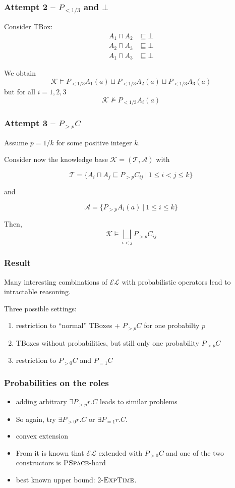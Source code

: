 \documentclass{beamer}
\newcommand{\el}{\ensuremath{\mathcal{EL}}\xspace}
\newcommand{\exptime}{\ensuremath{\textsc{ExpTime}}\xspace}
\newcommand{\pspace}{\ensuremath{\textsc{PSpace}}\xspace}
\begin{document}
\begin{frame}
  \frametitle{Attempt 2 -- $P_{<1/3}$ and $\bot$}

  Consider TBox: 
  \begin{align*}
    A_1\sqcap A_2 &\sqsubseteq\bot \\
    A_2\sqcap A_3 &\sqsubseteq\bot \\
    A_1\sqcap A_3 &\sqsubseteq\bot
  \end{align*}

  \pause
  We obtain 
  $$\mathcal K\models P_{<1/3}A_1(a)\sqcup P_{<1/3}A_2(a)\sqcup P_{<1/3}A_3(a)$$ but for all $i=1,2,3$ 
  $$\mathcal K\not\models P_{<1/3}A_i(a)$$
\end{frame}

\begin{frame}
  \frametitle{Attempt 3 -- $P_{>p}C$}
  Assume $p=1/k$ for some positive integer $k$.

  Consider now the knowledge base $\mathcal K=(\mathcal T, \mathcal A)$ with

  $$\mathcal T=\{A_i\sqcap A_j\sqsubseteq P_{>p}C_{ij}~|~1\leq i<j\leq k\}$$

  and 

  $$\mathcal A=\{P_{>p}A_i(a)~|~1\leq i\leq k\}$$
  

  \pause
  Then, $$\mathcal K \models \bigsqcup_{i<j}P_{>p}C_{ij}$$
\end{frame}


\begin{frame}
  \frametitle{Result}
  Many interesting combinations of $\el$ with 
  probabilistic operators lead to intractable reasoning. 

  Three possible settings:

  \begin{enumerate}
    \item restriction to ``normal'' TBoxes + $P_{>p}C$ for one probabilty $p$
    \item TBoxes without probabilities, but still only one probability $P_{>p}C$
    \item restriction to $P_{>0}C$ and $P_{=1}C$
  \end{enumerate}
\end{frame}


\begin{frame}
  \frametitle{Probabilities on the roles}
  \begin{itemize}
    \item adding arbitrary $\exists P_{>p}r.C$ leads to similar problems 
    \item So again, try $\exists P_{>0}r.C$ or $\exists P_{=1}r.C$. 
    \item convex extension
    \item From \cite{ls} it is known that \el extended with $P_{>0}C$ and one of the two constructors is \pspace-hard
    \item best known upper bound: 2-$\exptime$.
  \end{itemize}
\end{frame}
\end{document}
